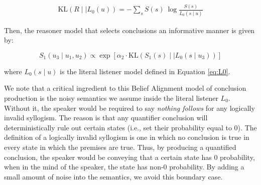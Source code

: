 \documentclass[floatsintext, doc]{apa6}
\begin{document}
\begin{align}
  \label{eq:KL-divergence}
  \text{KL}({R \mid \mid L_0}(u)) = - \sum_{s} S(s) \ \log \frac{S(s)}{{L_{0}}(s \mid u)}
\end{align}

\noindent Then, the reasoner model that selects conclusions an informative manner is given by: 

\begin{equation}
S_1(u_3 \mid u_1,  u_2) \propto  \exp [ \alpha_2 \cdot \text{KL}({S_1(s) \mid \mid L_0}(s \mid u_3)) ]  \label{eq:R1b}
\end{equation}

\noindent where $L_0(s \mid u)$ is the literal listener model defined in Equation \ref{eq:L0}. 

We note that a critical ingredient to this Belief Alignment model of conclusion production is the noisy semantics we assume inside the literal listener $L_0$.
Without it, the speaker would be required to say \emph{nothing follows} for any logically invalid syllogism. 
The reason is that any quantifier conclusion will deterministically rule out certain states (i.e., set their probability equal to 0). 
The definition of a logically invalid syllogism is one in which no conclusion is true in every state in which the premises are true.
Thus, by producing a quantified conclusion, the speaker would be conveying that a certain state has 0 probability, when in the mind of the speaker, the state has non-0 probability. 
By adding a small amount of noise into the semantics, we avoid this boundary case.



%

\end{document}
